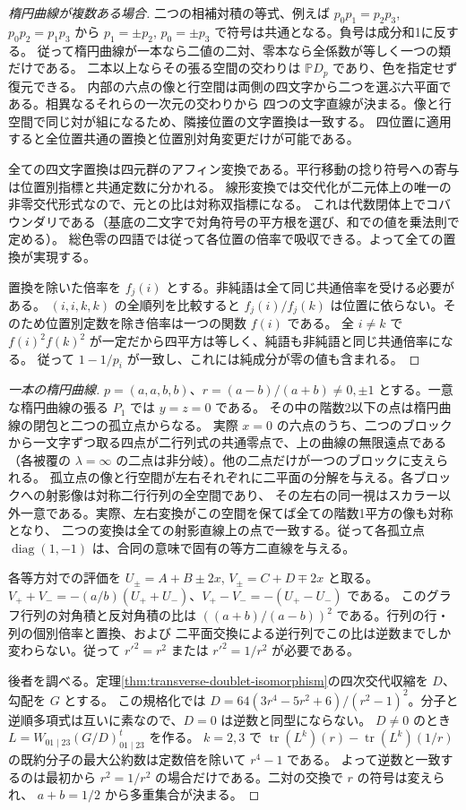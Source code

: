 \begin{proof}[楕円曲線が複数ある場合]
二つの相補対積の等式、例えば $p_0p_1=p_2p_3$, $p_0p_2=p_1p_3$ から
$p_1=\pm p_2$, $p_0=\pm p_3$ で符号は共通となる。負号は成分和1に反する。
従って楕円曲線が一本なら二値の二対、零本なら全係数が等しく一つの類だけである。
二本以上ならその張る空間の交わりは $\mathbb P D_p$ であり、色を指定せず復元できる。
内部の六点の像と行空間は両側の四文字から二つを選ぶ六平面である。相異なるそれらの一次元の交わりから
四つの文字直線が決まる。像と行空間で同じ対が組になるため、隣接位置の文字置換は一致する。
四位置に適用すると全位置共通の置換と位置別対角変更だけが可能である。

全ての四文字置換は四元群のアフィン変換である。平行移動の捻り符号への寄与は位置別指標と共通定数に分かれる。
線形変換では交代化が二元体上の唯一の非零交代形式なので、元との比は対称双指標になる。
これは代数閉体上でコバウンダリである（基底の二文字で対角符号の平方根を選び、和での値を乗法則で定める）。
総色零の四語では従って各位置の倍率で吸収できる。よって全ての置換が実現する。

置換を除いた倍率を $f_j(i)$ とする。非純語は全て同じ共通倍率を受ける必要がある。
$(i,i,k,k)$ の全順列を比較すると $f_j(i)/f_j(k)$ は位置に依らない。そのため位置別定数を除き倍率は一つの関数 $f(i)$ である。
全 $i\ne k$ で $f(i)^2 f(k)^2$ が一定だから四平方は等しく、純語も非純語と同じ共通倍率になる。
従って $1-1/p_i$ が一致し、これには純成分が零の値も含まれる。
\end{proof}

\begin{proof}[一本の楕円曲線]
$p=(a,a,b,b)$、$r=(a-b)/(a+b)\ne0,\pm1$ とする。一意な楕円曲線の張る $P_1$ では $y=z=0$ である。
その中の階数2以下の点は楕円曲線の閉包と二つの孤立点からなる。
実際 $x=0$ の六点のうち、二つのブロックから一文字ずつ取る四点が二行列式の共通零点で、上の曲線の無限遠点である
（各被覆の $\lambda=\infty$ の二点は非分岐）。他の二点だけが一つのブロックに支えられる。
孤立点の像と行空間が左右それぞれに二平面の分解を与える。各ブロックへの射影像は対称二行行列の全空間であり、
その左右の同一視はスカラー以外一意である。実際、左右変換がこの空間を保てば全ての階数1平方の像も対称となり、
二つの変換は全ての射影直線上の点で一致する。従って各孤立点 $\operatorname{diag}(1,-1)$ は、合同の意味で固有の等方二直線を与える。

各等方対での評価を $U_\pm=A+B\pm2x$, $V_\pm=C+D\mp2x$ と取る。
$V_++V_-=-(a/b)(U_++U_-)$、$V_+-V_-=-(U_+-U_-)$ である。
このグラフ行列の対角積と反対角積の比は $((a+b)/(a-b))^2$ である。行列の行・列の個別倍率と置換、および
二平面交換による逆行列でこの比は逆数までしか変わらない。従って $r'^2=r^2$ または $r'^2=1/r^2$ が必要である。

後者を調べる。定理\ref{thm:transverse-doublet-isomorphism}の四次交代収縮を $D$、勾配を $G$ とする。
この規格化では $D=64(3r^4-5r^2+6)/(r^2-1)^2$。分子と逆順多項式は互いに素なので、$D=0$ は逆数と同型にならない。
$D\ne0$ のとき $L=W_{01\mid23}(G/D)_{01\mid23}^{t}$ を作る。
$k=2,3$ で $\operatorname{tr}(L^k)(r)-\operatorname{tr}(L^k)(1/r)$ の既約分子の最大公約数は定数倍を除いて $r^4-1$ である。
よって逆数と一致するのは最初から $r^2=1/r^2$ の場合だけである。二対の交換で $r$ の符号は変えられ、
$a+b=1/2$ から多重集合が決まる。
\end{proof}

